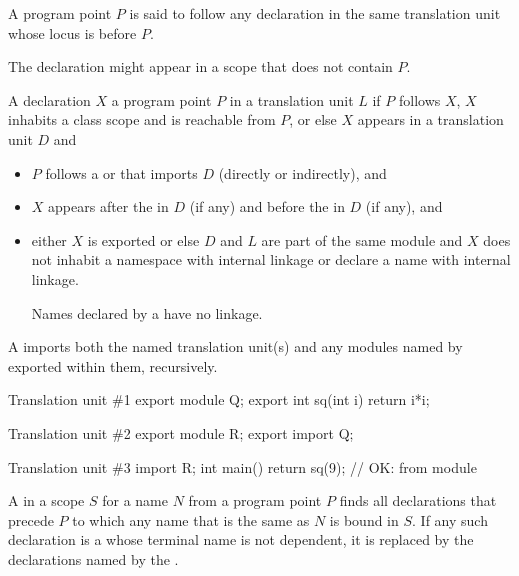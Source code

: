 \pnum
A program point $P$ is said to follow
any declaration in the same translation unit
whose locus is before $P$.
\begin{note}
The declaration might appear in a scope that does not contain $P$.
\end{note}
%
A declaration $X$ 
a program point $P$ in a translation unit $L$
if $P$ follows $X$, $X$ inhabits a class scope and is reachable from $P$, or
else $X$ appears in a translation unit $D$ and
\begin{itemize}
\item
$P$ follows
a  or 
that imports $D$ (directly or indirectly), and
\item
$X$ appears after the  in $D$ (if any) and
before the  in $D$ (if any), and
\item
either $X$ is exported or else $D$ and $L$ are part of the same module and
$X$ does not inhabit a namespace with internal linkage or
declare a name with internal linkage.
\begin{note}
Names declared by a  have no linkage.
\end{note}
\end{itemize}
\begin{note}
A  imports both
the named translation unit(s) and
any modules named by exported
 within them,
recursively.
\begin{example}
\begin{codeblocktu}{Translation unit \#1}
export module Q;
export int sq(int i) { return i*i; }
\end{codeblocktu}

\begin{codeblocktu}{Translation unit \#2}
export module R;
export import Q;
\end{codeblocktu}

\begin{codeblocktu}{Translation unit \#3}
import R;
int main() { return sq(9); }    // OK:  from module 
\end{codeblocktu}
\end{example}
\end{note}

\pnum
{}%
A  in a scope $S$
for a name $N$ from a program point $P$
finds all declarations that precede $P$
to which any name that is the same as $N$ is bound in $S$.
If any such declaration is a 
whose terminal name
is not dependent,
it is replaced by the declarations named by
the .


